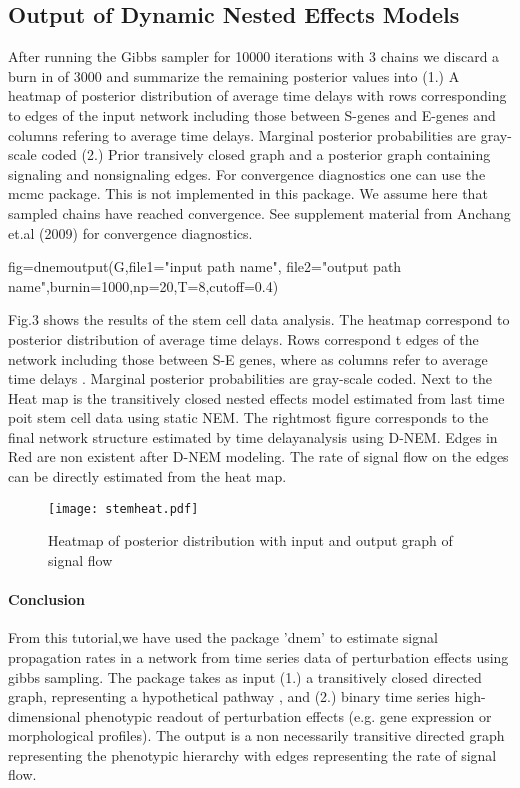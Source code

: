 \documentclass[11pt,a4paper]{article}
\begin{document}
\subsection{Output of Dynamic Nested Effects Models}
After running the Gibbs sampler for 10000 iterations with 3 chains we discard a burn in of 3000 and summarize the remaining posterior values into (1.) A heatmap of posterior distribution of average time delays with rows corresponding to edges of the input network including those between S-genes and E-genes and columns refering to average time delays. Marginal posterior probabilities are gray-scale coded (2.) Prior transively closed graph and a posterior graph containing signaling and nonsignaling edges. For convergence diagnostics one can use the mcmc package. This is not implemented in this package. We assume here that sampled chains have reached convergence. See supplement material from Anchang et.al (2009) for convergence diagnostics.
\begin{Schunk}
\begin{Sinput}
fig=dnemoutput(G,file1="input path name",
file2="output path name",burnin=1000,np=20,T=8,cutoff=0.4)
\end{Sinput}
\end{Schunk}
Fig.3 shows the results of the stem cell data analysis. The heatmap correspond to posterior distribution of average time delays. Rows correspond t edges of the network including those between S-E genes, where as columns refer to average time delays . Marginal posterior probabilities are gray-scale coded. Next to the Heat map is the transitively closed nested effects model estimated from last time poit stem cell data using static NEM. The rightmost figure corresponds to the final network structure estimated by time delayanalysis using D-NEM. Edges in Red are non existent after D-NEM modeling. The rate of signal flow on the edges can be directly estimated from the heat map. 
\begin{figure}[t]
\begin{center}
\texttt{[image: stemheat.pdf]}
\end{center}
\caption{\label{figure} Heatmap of posterior distribution with input and output graph of signal flow}
\end{figure}
\paragraph{Conclusion}
From this tutorial,we have used the package 'dnem' to estimate signal propagation rates in a
network from time series data of perturbation effects using gibbs sampling. The package takes as input (1.) a transitively closed directed graph, representing a hypothetical pathway , and (2.) binary time series high-dimensional phenotypic readout of perturbation effects (e.g. gene expression or morphological profiles). The output is a non necessarily transitive directed  graph representing the phenotypic hierarchy with edges representing the rate of signal flow.
\end{document}
